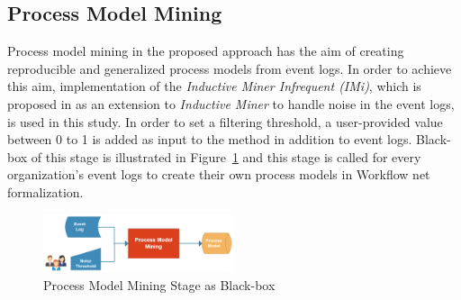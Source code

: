 \subsection{Process Model Mining}
\label{subsec:process-model-mining}
Process model mining in the proposed approach has the aim of creating reproducible and generalized process models from event logs. In order to achieve this aim, implementation of the \textit{Inductive Miner Infrequent (IMi)}, which is proposed in \cite{leemans2014discoveringinfrequent} as an extension to \textit{Inductive Miner} to handle noise in the event logs, is used in this study. In order to set a filtering threshold, a user-provided value between 0 to 1 is added as input to the method in addition to event logs. Black-box of this stage is illustrated in Figure~\ref{fig:process-model-mining-blackbox} and this stage is called for every organization's event logs to create their own process models in Workflow net formalization.
\begin{figure}
  \centering
  \includegraphics[width=0.5\textwidth]{4_methodology/process-model-mining-blackbox}
  \caption{Process Model Mining Stage as Black-box }
  \label{fig:process-model-mining-blackbox}
\end{figure}

